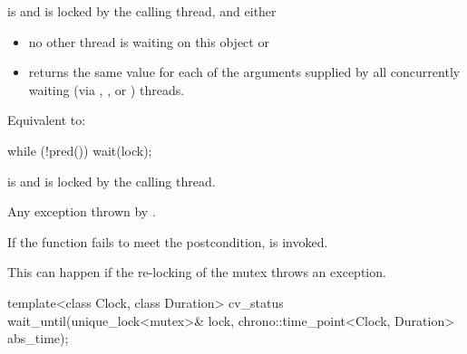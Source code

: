 \begin{itemdescr}
\pnum
\expects
{} is  and  is
locked by the calling thread, and either
\begin{itemize}
\item no other thread is waiting on this  object or
\item {} returns the same value for each of the 
arguments supplied by all concurrently waiting (via ,
, or ) threads.
\end{itemize}

\pnum
\effects
Equivalent to:
\begin{codeblock}
while (!pred())
  wait(lock);
\end{codeblock}

\pnum
\ensures
{} is  and 
is locked by the calling thread.

\pnum
\throws
Any exception thrown by .

\pnum
\remarks
If the function fails to meet the postcondition, 
is invoked.
\begin{note}
This can happen if the re-locking of the mutex throws an exception.
\end{note}
\end{itemdescr}

%
\begin{itemdecl}
template<class Clock, class Duration>
  cv_status wait_until(unique_lock<mutex>& lock,
                       chrono::time_point<Clock, Duration> abs_time);
\end{itemdecl}

